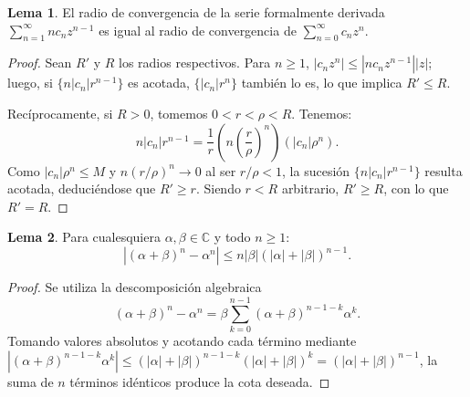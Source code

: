 \documentclass[11pt,a4paper]{article}
\theoremstyle{definition}
\newtheorem{lema}{Lema}[section]
\theoremstyle{remark}
\numberwithin{equation}{section}
\begin{document}
\begin{lema}
El radio de convergencia de la serie formalmente derivada $\sum_{n=1}^\infty n c_n z^{n-1}$ es igual al radio de convergencia de $\sum_{n=0}^\infty c_n z^n$.
\end{lema}
\begin{proof}
Sean $R'$ y $R$ los radios respectivos. Para $n \ge 1$, $|c_n z^n| \le |n c_n z^{n-1}| |z|$; luego, si $\{n |c_n| r^{n-1}\}$ es acotada, $\{|c_n| r^n\}$ también lo es, lo que implica $R' \le R$.

Recíprocamente, si $R > 0$, tomemos $0 < r < \rho < R$. Tenemos:
\[
n |c_n| r^{n-1} = \frac{1}{r} \left( n \left(\frac{r}{\rho}\right)^n \right) (|c_n| \rho^n).
\]
Como $|c_n| \rho^n \le M$ y $n(r/\rho)^n \to 0$ al ser $r/\rho < 1$, la sucesión $\{n |c_n| r^{n-1}\}$ resulta acotada, deduciéndose que $R' \ge r$. Siendo $r < R$ arbitrario, $R' \ge R$, con lo que $R' = R$.
\end{proof}

\begin{lema}
Para cualesquiera $\alpha, \beta \in \mathbb{C}$ y todo $n \ge 1$:
\begin{equation}
|(\alpha + \beta)^n - \alpha^n| \le n |\beta| (|\alpha| + |\beta|)^{n-1}.
\end{equation}
\end{lema}
\begin{proof}
Se utiliza la descomposición algebraica
\[
(\alpha + \beta)^n - \alpha^n = \beta \sum_{k=0}^{n-1} (\alpha + \beta)^{n-1-k} \alpha^k.
\]
Tomando valores absolutos y acotando cada término mediante $|(\alpha+\beta)^{n-1-k}\alpha^k| \le (|\alpha|+|\beta|)^{n-1-k}(|\alpha|+|\beta|)^k = (|\alpha|+|\beta|)^{n-1}$, la suma de $n$ términos idénticos produce la cota deseada.
\end{proof}
\end{document}
